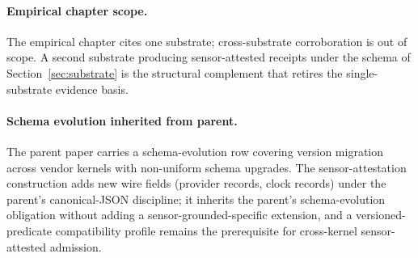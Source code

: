 \paragraph{Empirical chapter scope.}
The empirical chapter cites one substrate; cross-substrate corroboration is out of scope. A second substrate producing sensor-attested receipts under the schema of Section~\ref{sec:substrate} is the structural complement that retires the single-substrate evidence basis.

\paragraph{Schema evolution inherited from parent.}
The parent paper carries a schema-evolution row covering version migration across vendor kernels with non-uniform schema upgrades. The sensor-attestation construction adds new wire fields (provider records, clock records) under the parent's canonical-JSON discipline; it inherits the parent's schema-evolution obligation without adding a sensor-grounded-specific extension, and a versioned-predicate compatibility profile remains the prerequisite for cross-kernel sensor-attested admission.
